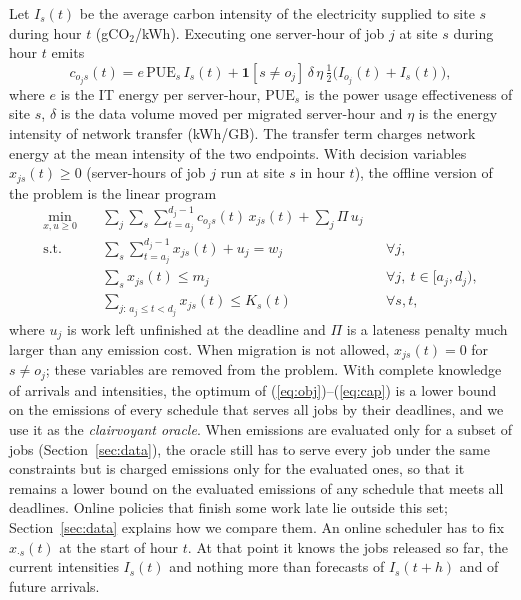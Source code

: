 Let $I_s(t)$ be the average carbon intensity of the electricity supplied to site $s$ during hour $t$ (gCO$_2$/kWh). Executing one server-hour of job $j$ at site $s$ during hour $t$ emits
\begin{equation}\label{eq:unitcost}
c_{o_j s}(t) = e\,\mathrm{PUE}_s\, I_s(t) + \mathbf{1}[s\neq o_j]\,\delta\,\eta\,\tfrac{1}{2}\big(I_{o_j}(t)+I_s(t)\big),
\end{equation}
where $e$ is the IT energy per server-hour, $\mathrm{PUE}_s$ is the power usage effectiveness of site $s$, $\delta$ is the data volume moved per migrated server-hour and $\eta$ is the energy intensity of network transfer (kWh/GB). The transfer term charges network energy at the mean intensity of the two endpoints. With decision variables $x_{js}(t)\ge 0$ (server-hours of job $j$ run at site $s$ in hour $t$), the offline version of the problem is the linear program
\begin{align}
\min_{x,u\ge 0}\quad & \sum_j\sum_{s}\sum_{t=a_j}^{d_j-1} c_{o_j s}(t)\,x_{js}(t) + \sum_j \Pi\, u_j \label{eq:obj}\\
\text{s.t.}\quad & \textstyle\sum_{s}\sum_{t=a_j}^{d_j-1} x_{js}(t) + u_j = w_j && \forall j, \label{eq:work}\\
& \textstyle\sum_{s} x_{js}(t) \le m_j && \forall j,\ t\in[a_j,d_j), \label{eq:width}\\
& \textstyle\sum_{j:\,a_j\le t<d_j} x_{js}(t) \le K_s(t) && \forall s,t, \label{eq:cap}
\end{align}
where $u_j$ is work left unfinished at the deadline and $\Pi$ is a lateness penalty much larger than any emission cost. When migration is not allowed, $x_{js}(t)=0$ for $s\neq o_j$; these variables are removed from the problem. With complete knowledge of arrivals and intensities, the optimum of (\ref{eq:obj})--(\ref{eq:cap}) is a lower bound on the emissions of every schedule that serves all jobs by their deadlines, and we use it as the \emph{clairvoyant oracle}. When emissions are evaluated only for a subset of jobs (Section~\ref{sec:data}), the oracle still has to serve every job under the same constraints but is charged emissions only for the evaluated ones, so that it remains a lower bound on the evaluated emissions of any schedule that meets all deadlines. Online policies that finish some work late lie outside this set; Section~\ref{sec:data} explains how we compare them. An online scheduler has to fix $x_{\cdot s}(t)$ at the start of hour $t$. At that point it knows the jobs released so far, the current intensities $I_s(t)$ and nothing more than forecasts of $I_s(t+h)$ and of future arrivals.

